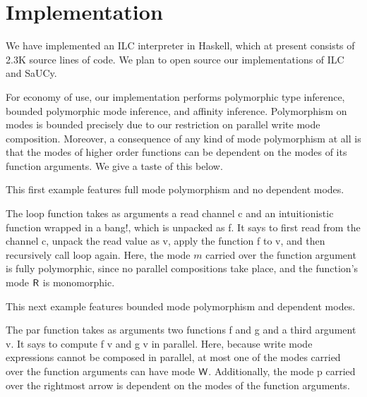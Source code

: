 \section{Implementation}
\label{sec:implementation}

We have implemented an ILC interpreter in Haskell, which at present consists of
2.3K source lines of code. We plan to open source our implementations of ILC and
SaUCy.

For economy of use, our implementation performs polymorphic type inference,
bounded polymorphic mode inference, and affinity inference. Polymorphism on
modes is bounded precisely due to our restriction on parallel write mode
composition. Moreover, a consequence of any kind of mode polymorphism at all is
that the modes of higher order functions can be dependent on the modes of its
function arguments. We give a taste of this below.

This first example features full mode polymorphism and no dependent modes.

The \textsf{loop} function
takes as arguments a read channel \textsf{c} and an intuitionistic function
wrapped in a bang!, which is unpacked as \textsf{f}.  It says to first read from
the channel \textsf{c}, unpack the read value as \textsf{v}, apply the function
\textsf{f} to \textsf{v}, and then recursively call \textsf{loop} again. Here,
the mode $m$ carried over the function argument is fully polymorphic, since no
parallel compositions take place, and the function's mode $\textsf{R}$ is monomorphic.

This next example features bounded mode polymorphism and dependent modes.

The \textsf{par} function takes as arguments two functions \textsf{f} and
\textsf{g} and a third argument \textsf{v}. It says to compute \textsf{f v} and
\textsf{g v} in parallel. Here, because write mode expressions cannot be
composed in parallel, at most one of the modes carried over the function
arguments can have mode $\textsf{W}$. Additionally, the mode \textsf{p} carried over
the rightmost arrow is dependent on the modes of the function arguments.
